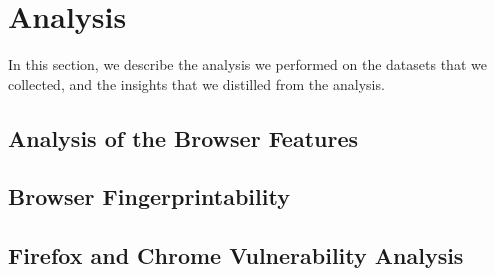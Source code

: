 \section{Analysis}
\label{sec:analysis}

In this section, we describe the analysis we performed on the datasets
that we collected, and the insights that we distilled from the
analysis.

\subsection{Analysis of the Browser Features}



\subsection{Browser Fingerprintability}



\subsection{Firefox and Chrome Vulnerability Analysis}

